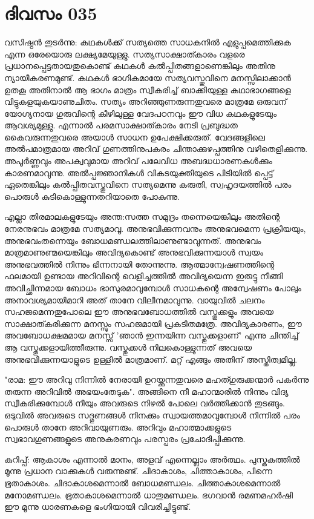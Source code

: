 \newpage
\section{ദിവസം 035}



വസിഷ്ഠന്‍ തുടര്‍ന്നു: കഥകള്‍ക്ക്‌ സത്യത്തെ സാധകനില്‍ എളുപ്പമെത്തിക്കുക എന്ന ഒരേയൊരു ലക്ഷ്യമേയുള്ളു. സത്യസാക്ഷാത്കാരം വളരെ പ്രധാനപ്പെട്ടതായതുകൊണ്ട്‌ കഥകള്‍ കല്‍പ്പിതങ്ങളാണെങ്കിലും അതിനു ന്യായീകരണമുണ്ട്‌. കഥകള്‍ ഭാഗികമായേ സത്യവസ്തുവിനെ മനസ്സിലാക്കാന്‍ ഉതകൂ അതിനാല്‍ ആ ഭാഗം മാത്രം സ്വീകരിച്ച്‌ ബാക്കിയുള്ള കഥാഭാഗങ്ങളെ വിട്ടുകളയുകയാണുചിതം. സത്യം അറിഞ്ഞുണരുന്നതുവരെ മാത്രമേ ഒരുവന്‌ യോഗ്യനായ ഗുരുവിന്റെ കീഴിലുള്ള വേദപഠനവും ഈ വിധ കഥകളുടേയും ആവശ്യമുള്ളു. എന്നാല്‍ പരമസാക്ഷാത്കാരം നേടി പ്രബുദ്ധത കൈവരുന്നതുവരെ അയാള്‍ സാധന ഉപേക്ഷിക്കരുത്‌. വേദങ്ങളിലെ അല്‍പമാത്രമായ അറിവ്‌ ഗുണത്തിനുപകരം ചിന്താക്കുഴപ്പത്തിനു വഴിതെളിക്കുന്നു. അപൂര്‍ണ്ണവും അപക്വവുമായ അറിവ്‌ പലേവിധ അബദ്ധധാരണകള്‍ക്കും കാരണമാവുന്നു. അല്‍പ്പജ്ഞാനികള്‍ വികടയുക്തിയുടെ പിടിയില്‍ പ്പെട്ട്‌ ഏതെങ്കിലും കല്‍പ്പിതവസ്തുവിനെ സത്യമെന്നു കരുതി, സ്വഹൃദയത്തില്‍ പരം പൊരുള്‍ കുടികൊള്ളുന്നതറിയാതെ പോകുന്നു. 

എല്ലാ തിരമാലകളുടേയും അന്ത:സത്ത സമുദ്രം തന്നെയെങ്കിലും അതിന്റെ നേരനുഭവം മാത്രമേ സത്യമാവൂ. അനുഭവിക്കുന്നവനും അനുഭവമെന്ന പ്രക്രിയയും, അനുഭവംതന്നെയും ബോധമണ്ഡലത്തിലാണുണ്ടാവുന്നത്‌. അനുഭവം മാത്രമാണുണ്മയെങ്കിലും അവിദ്യകൊണ്ട്‌ അനുഭവിക്കുന്നയാള്‍ സ്വയം അനുഭവത്തില്‍ നിന്നും ഭിന്നനായി തോന്നുന്നു. ആത്മാന്വേഷണത്തിന്റെ ഫലമായി ഉണ്ടായ അറിവിന്റെ വെളിച്ചത്തില്‍ അവിദ്യയെന്ന ഇരുട്ടു നീങ്ങി അവിച്ഛിന്നമായ ബോധം ഭാസുരമാവുമ്പോള്‍ സാധകന്റെ അന്വേഷണം പോലും അനാവശ്യമായിമാറി അത്  താനേ വിലീനമാവുന്നു. വായുവില്‍ ചലനം സഹജമെന്നതുപോലെ ഈ അനുഭവബോധത്തില്‍ വസ്തുക്കളും അവയെ സാക്ഷാത്കരിക്കുന്ന മനസ്സും സഹജമായി പ്രകടിതമത്രേ. അവിദ്യകാരണം, ഈ അവബോധക്ഷമമായ മനസ്സ്‌ 'ഞാന്‍ ഇന്നയിന്ന വസ്തുക്കളാണ്‌' എന്നു ചിന്തിച്ച്‌ ആ വസ്തുക്കളായിത്തീരുന്നു. വസ്തുക്കള്‍ നിലകൊള്ളുന്നത്‌ അവയെ അനുഭവിക്കുന്നയാളുടെ ഉള്ളില്‍ മാത്രമാണ്‌. മറ്റ്  എങ്ങും അതിന്‌ അസ്തിത്വമില്ല. 

"രാമ: ഈ അറിവു നിന്നില്‍ നേരായി ഉറയ്ക്കുന്നതുവരെ മഹത്ഗുരുക്കന്മാര്‍ പകര്‍ന്നു തരുന്ന അറിവില്‍ അഭയംതേടുക". അങ്ങിനെ നീ മഹാന്മാരില്‍ നിന്നും വിദ്യ സ്വീകരിക്കുമ്പോള്‍ നീയും അവരുടെ നിഴല്‍ പോലെ വര്‍ത്തിക്കാന്‍ തുടങ്ങും. ഒടുവില്‍ അവരുടെ സദ്ഗുണങ്ങള്‍ നിനക്കും സ്വായത്തമാവുമ്പോള്‍ നിന്നില്‍ പരം പൊരുള്‍ താനേ അറിവായുണരും. അറിവും മഹാത്മാക്കളുടെ സ്വഭാവഗുണങ്ങളുടെ അനുകരണവും പരസ്പരം പ്രചോദിപ്പിക്കുന്നു.

കുറിപ്പ്‌:
ആകാശം എന്നാല്‍ മാനം, അളവ്‌ എന്നെല്ലാം അര്‍ത്ഥം. പുസ്തകത്തില്‍ മൂന്നു പ്രധാന വാക്കുകള്‍ വരുന്നുണ്ട്‌. ചിദാകാശം, ചിത്താകാശം, പിന്നെ ഭൂതാകാശം. ചിദാകാശമെന്നാല്‍ ബോധമണ്ഡലം. ചിത്താകാശമെന്നാല്‍ മനോമണ്ഡലം. ഭൂതാകാശമെന്നാല്‍ ധാതുമണ്ഡലം. ഭഗവാന്‍ രമണമഹര്‍ഷി ഈ മൂന്നു ധാരണകളെ ഭംഗിയായി വിവരിച്ചിട്ടുണ്ട്‌. 


